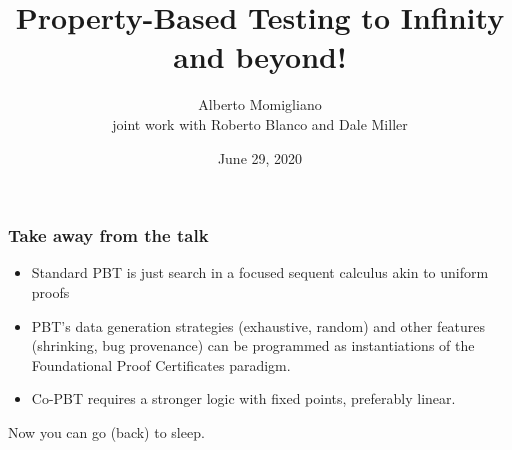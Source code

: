 \documentclass{beamer}
\begin{document}
\title{
Property-Based Testing to Infinity and beyond!}


\author{Alberto Momigliano\\ joint work with {Roberto Blanco} and Dale Miller}
\date{June 29, 2020}

\begin{frame}
\titlepage
\end{frame}
\begin{frame}
  \frametitle{Take away from the talk}
  \begin{itemize}
  \item Standard PBT  is just search in a focused sequent calculus akin to uniform proofs
  \item PBT's data generation strategies (exhaustive, random) and
    other features (shrinking, bug provenance) can be programmed as
    instantiations of the Foundational Proof Certificates paradigm.
  \item Co-PBT requires a stronger logic with fixed points, preferably linear.
  \end{itemize}
    
   Now you can go (back) to sleep.

\end{frame}


\end{document}
